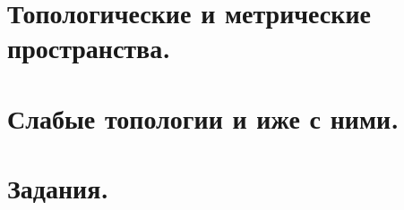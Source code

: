 \documentclass[a4paper,12pt,openany]{scrbook}
\begin{document}
    \frontmatter
    
    \tableofcontents
    \mainmatter
    \part{Топологические и метрические пространства.}
    
    
    
    
    
    
    
    
    
    
    
    
    
    
    
    
    
    
    \part{Слабые топологии и иже с ними.}
    
    
    
    
    
    
    
    
    
    
    
    
    

    \part{Задания.}
    
    
    
\end{document}
